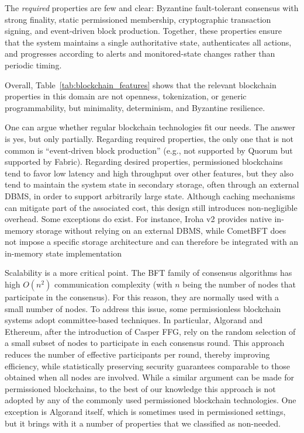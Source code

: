 The \emph{required} properties are few and clear: Byzantine fault-tolerant consensus with strong finality, static permissioned membership, cryptographic transaction signing, and event-driven block production. Together, these properties ensure that the system maintains a single authoritative state, authenticates all actions, and progresses according to alerts and monitored-state changes rather than periodic timing.

Overall, Table~\ref{tab:blockchain_features} shows that the relevant blockchain properties in this domain are not openness, tokenization, or generic programmability, but minimality, determinism, and Byzantine resilience.

One can argue whether regular blockchain technologies fit our needs. The answer is yes, but only partially.
Regarding required properties, the only one that is not common is ``event-driven block production'' (e.g., not supported by Quorum but supported by Fabric).
Regarding desired properties, permissioned blockchains tend to favor low latency and high throughput over other features, 
but they also tend to maintain the system state in secondary storage, often through an external DBMS, in order to support arbitrarily large state. Although caching mechanisms can mitigate part of the associated cost, this design still introduces non-negligible overhead. Some exceptions do exist. For instance, Iroha v2 provides native in-memory storage without relying on an external DBMS, while CometBFT does not impose a specific storage architecture and can therefore be integrated with an in-memory state implementation

Scalability is a more critical point. The BFT family of consensus algorithms has high $O(n^2)$ communication complexity (with $n$ being the number of nodes that participate in the consensus).
For this reason, they are normally used with a small number of nodes.
To address this issue, some permissionless blockchain systems adopt committee-based techniques. In particular, Algorand and Ethereum, after the introduction of Casper FFG, rely on the random selection of a small subset of nodes to participate in each consensus round. This approach reduces the number of effective participants per round, thereby improving efficiency, while statistically preserving security guarantees comparable to those obtained when all nodes are involved.
While a similar argument can be made for permissioned blockchains, to the best of our knowledge this approach is not adopted by any of the commonly used permissioned blockchain technologies. One exception is Algorand itself, which is sometimes used in permissioned settings, but it brings with it a number of properties that we classified as non-needed.
